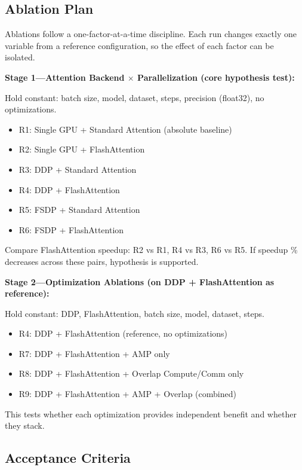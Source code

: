 \documentclass[12pt, a4paper]{article}
\begin{document}
\subsection{Ablation Plan}

Ablations follow a one-factor-at-a-time discipline. Each run changes exactly one variable from a reference configuration, so the effect of each factor can be isolated.

\vspace{1em}
\textbf{Stage 1---Attention Backend $\times$ Parallelization (core hypothesis test):}

Hold constant: batch size, model, dataset, steps, precision (float32), no optimizations.
\begin{itemize}
    \item R1: Single GPU + Standard Attention (absolute baseline)
    \item R2: Single GPU + FlashAttention
    \item R3: DDP + Standard Attention
    \item R4: DDP + FlashAttention
    \item R5: FSDP + Standard Attention
    \item R6: FSDP + FlashAttention
\end{itemize}

Compare FlashAttention speedup: R2 vs R1, R4 vs R3, R6 vs R5. If speedup \% decreases across these pairs, hypothesis is supported.

\vspace{1em}
\textbf{Stage 2---Optimization Ablations (on DDP + FlashAttention as reference):}

Hold constant: DDP, FlashAttention, batch size, model, dataset, steps.
\begin{itemize}
    \item R4: DDP + FlashAttention (reference, no optimizations)
    \item R7: DDP + FlashAttention + AMP only
    \item R8: DDP + FlashAttention + Overlap Compute/Comm only
    \item R9: DDP + FlashAttention + AMP + Overlap (combined)
\end{itemize}

This tests whether each optimization provides independent benefit and whether they stack.

\subsection{Acceptance Criteria}
\end{document}
